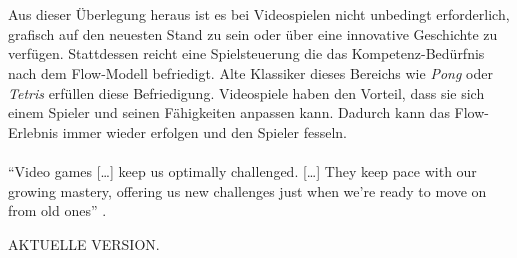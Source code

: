 \documentclass[a4paper,12pt]{scrartcl}
\begin{document}
\\\\
Aus dieser Überlegung heraus ist es bei Videospielen nicht unbedingt erforderlich, grafisch auf den neuesten Stand zu sein oder über eine innovative Geschichte zu verfügen. Stattdessen reicht eine Spielsteuerung die das Kompetenz-Bedürfnis nach dem Flow-Modell befriedigt. Alte Klassiker dieses Bereichs wie \textit{Pong} oder \textit{Tetris} erfüllen diese Befriedigung. Videospiele haben den Vorteil, dass sie sich einem Spieler und seinen Fähigkeiten anpassen kann. Dadurch kann das Flow-Erlebnis immer wieder erfolgen und den Spieler fesseln.
\\\\ 
\enquote{Video games […] keep us optimally challenged. […] They keep pace with our growing mastery, offering us new challenges just when we’re ready to move on from old ones} \cite{Ryan2011}.

AKTUELLE VERSION.





 























  
\newpage
\listoftables
\listoffigures
\newpage

\end{document}
